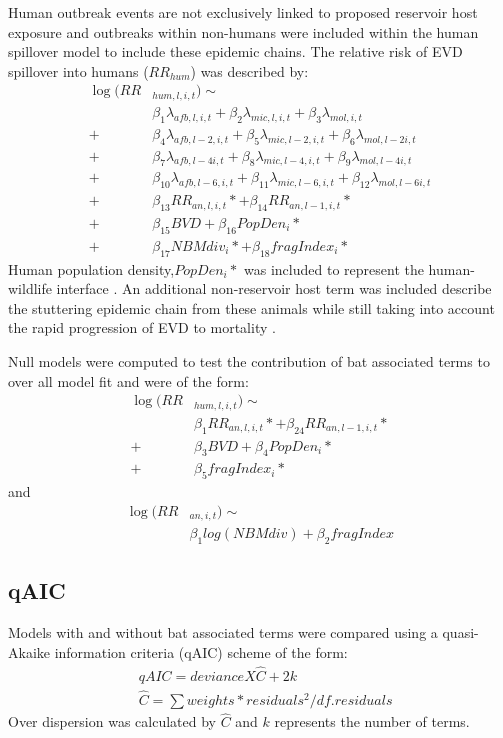 \documentclass[9pt,twoside,lineno]{pnas-new}
\begin{document}
Human outbreak events are not exclusively linked to proposed reservoir host exposure \cite{Pourrut2005TheAfrica} and outbreaks within non-humans were included within the human spillover model to include these epidemic chains. The relative risk of EVD spillover into humans ($RR_{hum}$) was described by:
\[
    \begin{split}
\log(RR&_{hum, l, i, t}) \sim \\
&\beta_1 \lambda_{afb, l, i, t} + \beta_2 \lambda_{mic, l, i, t} + \beta_3 \lambda_{mol, i, t} \\
 + &\beta_4 \lambda_{afb, l-2, i, t} + \beta_5 \lambda_{mic, l-2, i, t} + \beta_6 \lambda_{mol, l-2 i, t} \\
 + &\beta_7 \lambda_{afb, l-4 i, t} + \beta_8 \lambda_{mic, l-4, i, t} + \beta_9 \lambda_{mol, l-4 i, t} \\
 + &\beta_{10} \lambda_{afb, l-6, i, t} + \beta_{11} \lambda_{mic, l-6, i, t} + \beta_{12} \lambda_{mol, l-6 i, t} \\
 + &\beta_{13} RR_{an, l, i, t}* + \beta_{14} RR_{an, l-1, i, t}*  \\
 +&\beta_{15} BVD + \beta_{16} PopDen_{i}*  \\
 + &\beta_{17} NBM div_{i}* + \beta_{18} fragIndex_{i}*  
    \end{split}
\]
Human population density,$PopDen_{i}*$ was included to represent the human-wildlife interface \cite{Plowright2015EcologicalSpillover.}. An additional non-reservoir host term was included describe the stuttering epidemic chain from these animals while still taking into account the rapid progression of EVD to mortality \cite{Swanepoel1996ExperimentalVirus}. \par
Null models were computed to test the contribution of bat associated terms to over all model fit and were of the form:
\[
\begin{split}
   \log(RR&_{hum, l, i, t}) \sim \\ 
   &\beta_{1} RR_{an, l, i, t}* + \beta_{24} RR_{an, l-1, i, t}*  \\
 +&\beta_{3} BVD + \beta_{4} PopDen_{i}*  \\
 + &\beta_{5} fragIndex_{i}*
\end{split}
\]
and 
\[
\begin{split}
   \log(RR& _{an, i, t}) \sim \\
   & \beta_1 log(NBM div) + \beta_2 fragIndex
\end{split}
\]

\subsection{qAIC}
\label{qAIC}
Models with and without bat associated terms were compared using a quasi-Akaike information criteria (qAIC) scheme of the form: 
\[
    \begin{split}
        &qAIC = deviance X \hat{C} + 2k \\
        &\hat{C} = \sum{weights * residuals^2}/df.residuals
    \end{split}
\]
Over dispersion was calculated by $\hat{C}$ and $k$ represents the number of terms.\\
\end{document}
